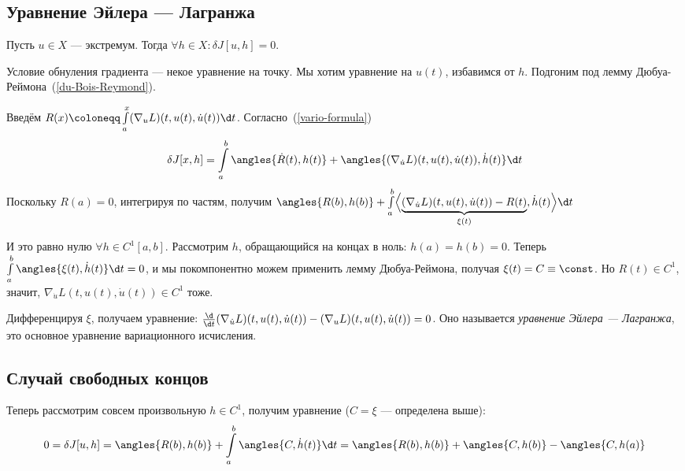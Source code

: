 \documentclass[a4paper]{article}
\begin{document}
    \subsection{Уравнение Эйлера --- Лагранжа}
    Пусть $u \in X$ --- экстремум.
    Тогда $\forall h \in X: \delta J[u, h] = 0$.

    Условие обнуления градиента --- некое уравнение на точку.
    Мы хотим уравнение на $u(t)$, избавимся от $h$.
    Подгоним под лемму Дюбуа-Реймона~(\cref{du-Bois-Reymond}).

    Введём $R(x) \coloneqq \int\limits_{a}^{x}(\nabla_u L)(t, u(t), \dot{u}(t))\d t$.
    Согласно~(\cref{vario-formula}) \[\delta J[x, h] = \int\limits_a^b \angles{\dot{R}(t), h(t)} + \angles{(\nabla_{\dot{u}} L)(t, u(t), \dot{u}(t)), \dot{h}(t)}\d t\]
    Поскольку $R(a) = 0$, интегрируя по частям, получим $\angles{R(b), h(b)} + \int\limits_{a}^{b}\Bigl\langle\underbrace{(\nabla_{\dot{u}}L)(t, u(t), \dot{u}(t)) - R(t)}_{\xi(t)}, \dot{h}(t)\Bigr\rangle\d t$

    И это равно нулю $\forall h \in C^1[a, b]$.
    Рассмотрим $h$, обращающийся на концах в ноль: $h(a)=h(b)=0$.
    Теперь $\int\limits_{a}^{b}\angles{\xi(t), \dot{h}(t)}\d t = 0$, и мы покомпонентно можем применить лемму Дюбуа-Реймона, получая $\xi(t) = C \equiv \const$.
    Но $R(t) \in C^1$, значит, $\nabla_{\dot{u}}L(t, u(t), \dot{u}(t)) \in C^1$ тоже.

    Дифференцируя $\xi$, получаем уравнение: $\frac{\d}{\d t}(\nabla_{\dot{u}} L)(t, u(t), \dot{u}(t)) - (\nabla_u L)(t, u(t), \dot{u}(t)) = 0$.
    Оно называется \emph{уравнение Эйлера --- Лагранжа}, это основное уравнение вариационного исчисления.

    \subsection{Случай свободных концов}
    Теперь рассмотрим совсем произвольную $h \in C^1$, получим уравнение ($C = \xi$ --- определена выше): \[0 = \delta J[u, h] = \angles{R(b), h(b)} + \int\limits_{a}^{b}\angles{C, \dot{h}(t)}\d t = \angles{R(b), h(b)} + \angles{C, h(b)} - \angles{C, h(a)}\]
\end{document}
